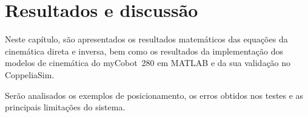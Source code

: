 \chapter{Resultados e discussão}
\label{ch:res-e-disc}

Neste capítulo, são apresentados os resultados matemáticos das equações da cinemática direta e inversa, bem como os resultados da implementação dos modelos de cinemática do myCobot~280 em MATLAB e da sua validação no CoppeliaSim.

Serão analisados os exemplos de posicionamento, os erros obtidos nos testes e as principais limitações do sistema.





